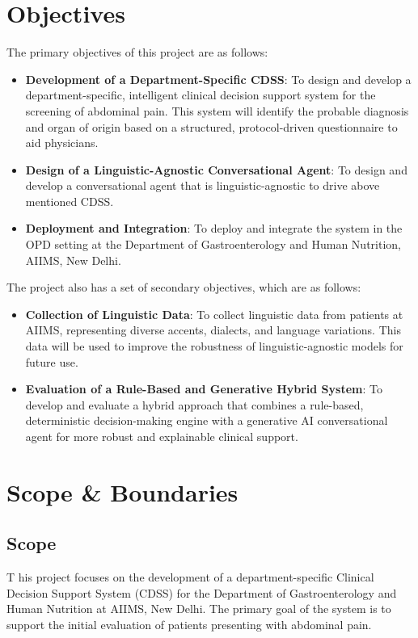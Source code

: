 \section{Objectives}
The primary objectives of this project are as follows:
\begin{itemize}
    \item \textcolor{TUMRed}{\textbf{Development of a Department-Specific CDSS}}: To design and develop a \textcolor{TUMBlue}{department-specific}, intelligent \textcolor{TUMBlue}{clinical decision support system} for the screening of \textcolor{TUMBlue}{abdominal pain}.  This system will identify the \textcolor{TUMBlue}{probable diagnosis} and organ of origin based on a structured, protocol-driven questionnaire to aid physicians.
    \item \textcolor{TUMRed}{\textbf{Design of a Linguistic-Agnostic Conversational Agent}}: To design and develop a conversational agent that is linguistic-agnostic to drive above mentioned CDSS.
    \item \textcolor{TUMRed}{\textbf{Deployment and Integration}}: To deploy and integrate the system in the OPD setting at the Department of Gastroenterology and Human Nutrition, AIIMS, New Delhi.
\end{itemize}
The project also has a set of secondary objectives, which are as follows:
\begin{itemize}
    \item \textcolor{TUMRed}{\textbf{Collection of Linguistic Data}}: To collect linguistic data from patients at AIIMS, representing diverse accents, dialects, and language variations. This data will be used to improve the robustness of linguistic-agnostic models for future use.
    \item \textcolor{TUMRed}{\textbf{Evaluation of a Rule-Based and Generative Hybrid System}}: To develop and evaluate a hybrid approach that combines a rule-based, deterministic decision-making engine with a generative AI conversational agent for more robust and explainable clinical support.
\end{itemize}
\section{Scope \& Boundaries}
\subsection{Scope}
\lettrine{T}{ }his project focuses on the development of a department-specific Clinical Decision Support System (CDSS) for the Department of Gastroenterology and Human Nutrition at AIIMS, New Delhi. The primary goal of the system is to support the initial evaluation of patients presenting with abdominal pain.\\[\baselineskip]

